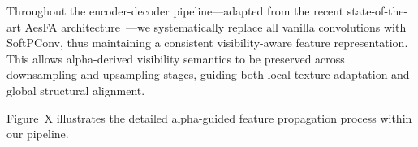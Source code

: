\documentclass[letterpaper]{article} %
\begin{document}
Throughout the encoder-decoder pipeline—adapted from the recent state-of-the-art AesFA architecture~\cite{kwon2024aesfa}—we systematically replace all vanilla convolutions with SoftPConv, thus maintaining a consistent visibility-aware feature representation. This allows alpha-derived visibility semantics to be preserved across downsampling and upsampling stages, guiding both local texture adaptation and global structural alignment.

Figure~X illustrates the detailed alpha-guided feature propagation process within our pipeline.



\end{document}

